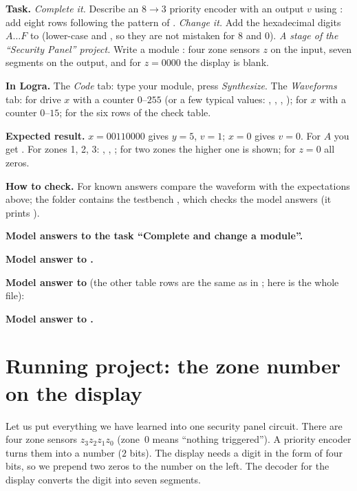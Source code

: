 \begin{diybox}
\textbf{Task.}  \emph{Complete it.} Describe an $8\to3$ priority
encoder with an output $v$ using : add eight rows following the
pattern of .  \emph{Change it.} Add the
hexadecimal digits $A\ldots F$ to  (lower-case  and
, so they are not mistaken for $8$ and $0$).  \emph{A stage of the
``Security Panel'' project.} Write a module : four zone
sensors $z$ on the input, seven segments on the output, and for $z=0000$ the
display is blank.

\textbf{In Logra.} The \emph{Code} tab: type your module, press
\emph{Synthesize}. The \emph{Waveforms} tab: for  drive $x$ with a
counter $0$--$255$ (or a few typical values: ,
, , ); for  $x$ with a
counter $0$--$15$; for  the six rows of the check table.

\textbf{Expected result.}  $x=00110000$ gives $y=5$, $v=1$;
$x=0$ gives $v=0$.  For $A$ you get . 
For zones 1, 2, 3: , , ; for two
zones the higher one is shown; for $z=0$ all zeros.

\textbf{How to check.} For known answers compare the waveform with the
expectations above; the folder  contains the testbench
, which checks the model answers (it prints ).
\end{diybox}

\textbf{Model answers to the task ``Complete and change a module''.}

\textbf{Model answer to .}

\textbf{Model answer to } (the other table rows are the same as in
; here is the whole file):

\textbf{Model answer to .}

\section{Running project: the zone number on the display}

Let us put everything we have learned into one security panel circuit. There are four zone sensors
$z_3z_2z_1z_0$ (zone~0 means ``nothing triggered''). A priority encoder
turns them into a number ($2$ bits). The display needs a digit in the form of
four bits, so we prepend two zeros to the number on the left. The decoder for the
display converts the digit into seven segments.

